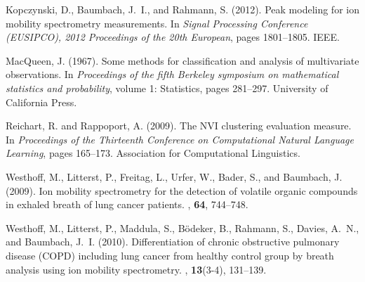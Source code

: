 \documentclass{article}
\begin{document}
\begin{thebibliography}{}
Kopczynski, D., Baumbach, J.~I., and Rahmann, S. (2012).
\newblock Peak modeling for ion mobility spectrometry measurements.
\newblock In {\em Signal Processing Conference (EUSIPCO), 2012 Proceedings of
  the 20th European\/}, pages 1801--1805. IEEE.

MacQueen, J. (1967).
\newblock Some methods for classification and analysis of multivariate
  observations.
\newblock In {\em Proceedings of the fifth Berkeley symposium on mathematical
  statistics and probability\/}, volume 1: Statistics, pages 281--297.
  University of California Press.

Reichart, R. and Rappoport, A. (2009).
\newblock The {NVI} clustering evaluation measure.
\newblock In {\em Proceedings of the Thirteenth Conference on Computational
  Natural Language Learning\/}, pages 165--173. Association for Computational
  Linguistics.

Westhoff, M., Litterst, P., Freitag, L., Urfer, W., Bader, S., and Baumbach, J.
  (2009).
\newblock Ion mobility spectrometry for the detection of volatile organic
  compounds in exhaled breath of lung cancer patients.
, {\bf 64}, 744--748.

Westhoff, M., Litterst, P., Maddula, S., B{\"o}deker, B., Rahmann, S., Davies,
  A.~N., and Baumbach, J.~I. (2010).
\newblock Differentiation of chronic obstructive pulmonary disease ({COPD})
  including lung cancer from healthy control group by breath analysis using ion
  mobility spectrometry.
, {\bf
  13}(3-4), 131--139.

\end{thebibliography}
\end{document}

